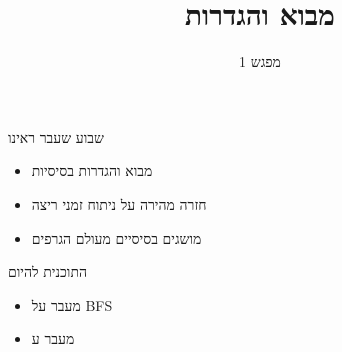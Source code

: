 \documentclass[luatex]{beamer}
\begin{document}
	\title{מבוא והגדרות}
	\subtitle{מפגש 1}
	\date{}
\begin{frame}{שבוע שעבר ראינו}
\pause
\begin{itemize}[<+->]
	\item מבוא והגדרות בסיסיות 
	\item חזרה מהירה על ניתוח זמני ריצה
	\item מושגים בסיסיים מעולם הגרפים
\end{itemize}
\end{frame}

\begin{frame}{התוכנית להיום}
\pause
\begin{itemize}[<+->]
	\item מעבר על BFS
	\item מעבר ע
\end{itemize}
\end{frame}
\end{document}
